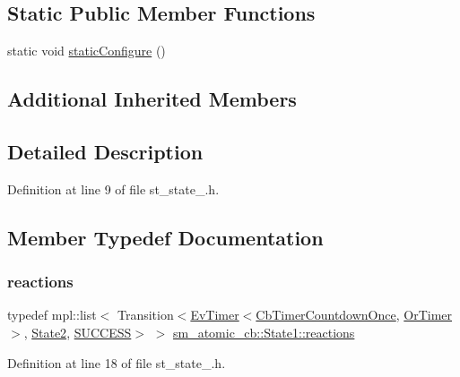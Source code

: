 \subsection*{Static Public Member Functions}
\begin{DoxyCompactItemize}
\item 
static void \hyperlink{structsm__atomic__cb_1_1State1_ab1d42c8c076f8672740626b87f3f45c0}{static\+Configure} ()
\end{DoxyCompactItemize}
\subsection*{Additional Inherited Members}


\subsection{Detailed Description}


Definition at line 9 of file st\+\_\+state\+\_.\+h.



\subsection{Member Typedef Documentation}
\mbox{\label{structsm__atomic__cb_1_1State1_ae6b0d9c700105b185fb7c3372ba0c5ad}} 
\subsubsection{\texorpdfstring{reactions}{reactions}}
{\footnotesize\ttfamily typedef mpl\+::list$<$ Transition$<$\hyperlink{structcl__ros__timer_1_1EvTimer}{Ev\+Timer}$<$\hyperlink{classcl__ros__timer_1_1CbTimerCountdownOnce}{Cb\+Timer\+Countdown\+Once}, \hyperlink{classsm__atomic__cb_1_1OrTimer}{Or\+Timer}$>$, \hyperlink{structsm__atomic__cb_1_1State2}{State2}, \hyperlink{structsmacc_1_1default__transition__tags_1_1SUCCESS}{S\+U\+C\+C\+E\+SS}$>$ $>$ \hyperlink{structsm__atomic__cb_1_1State1_ae6b0d9c700105b185fb7c3372ba0c5ad}{sm\+\_\+atomic\+\_\+cb\+::\+State1\+::reactions}}



Definition at line 18 of file st\+\_\+state\+\_.\+h.



